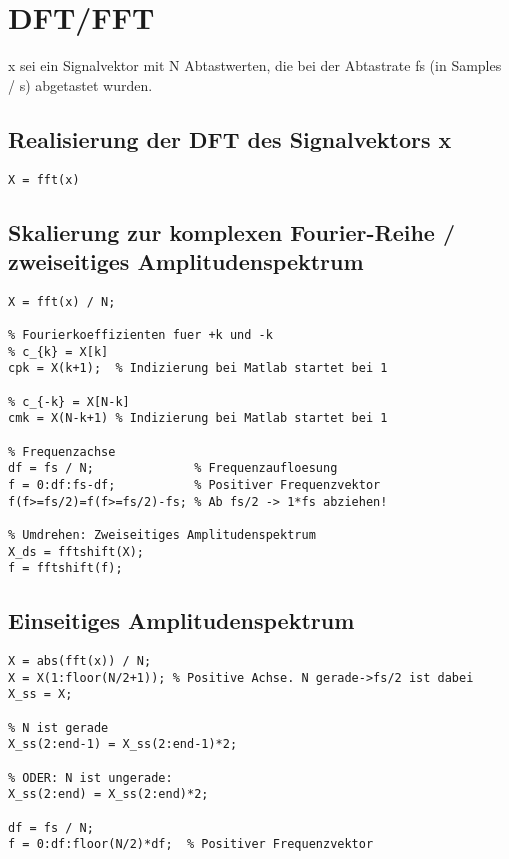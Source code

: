 \documentclass[threecolumn, german]{latex4ei/latex4ei_sheet}
\begin{document}
	\section{DFT/FFT}
	
	\begin{minipage}{\linewidth}
	\begin{sectionbox}
	x sei ein Signalvektor mit N Abtastwerten, die bei der Abtastrate fs 
	(in Samples / s) abgetastet wurden.
	\subsection{Realisierung der DFT des Signalvektors x}
		\begin{lstlisting}
X = fft(x)
		\end{lstlisting}
	\subsection{Skalierung zur komplexen Fourier-Reihe / zweiseitiges Amplitudenspektrum}
		\begin{lstlisting}
X = fft(x) / N;

% Fourierkoeffizienten fuer +k und -k
% c_{k} = X[k]
cpk = X(k+1);  % Indizierung bei Matlab startet bei 1

% c_{-k} = X[N-k]
cmk = X(N-k+1) % Indizierung bei Matlab startet bei 1

% Frequenzachse
df = fs / N;              % Frequenzaufloesung
f = 0:df:fs-df;           % Positiver Frequenzvektor
f(f>=fs/2)=f(f>=fs/2)-fs; % Ab fs/2 -> 1*fs abziehen!

% Umdrehen: Zweiseitiges Amplitudenspektrum
X_ds = fftshift(X);
f = fftshift(f);
		\end{lstlisting}
	\end{sectionbox}
	\end{minipage}
	\begin{sectionbox}
	\subsection{Einseitiges Amplitudenspektrum}
		\begin{lstlisting}
X = abs(fft(x)) / N;  
X = X(1:floor(N/2+1)); % Positive Achse. N gerade->fs/2 ist dabei
X_ss = X;

% N ist gerade
X_ss(2:end-1) = X_ss(2:end-1)*2;

% ODER: N ist ungerade:
X_ss(2:end) = X_ss(2:end)*2;

df = fs / N;
f = 0:df:floor(N/2)*df;  % Positiver Frequenzvektor
		\end{lstlisting}
	\end{sectionbox}
	
\end{document}
